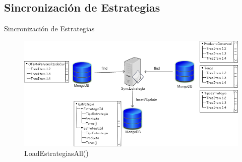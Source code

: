 \documentclass{bredelebeamer}
\begin{document}
\subsection{Sincronización de Estrategias}
\begin{frame}{Sincronización de Estrategias}
\begin{figure}
\centering
\includegraphics[scale=0.35]{imgs/EstrategiaLoad.png}
\caption{LoadEstrategiasAll()}
\end{figure}
\end{frame}
\end{document}
